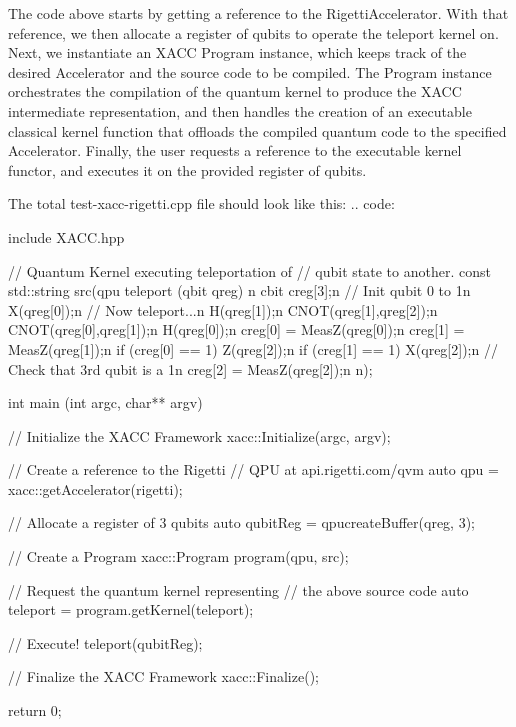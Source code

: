 \documentclass[letterpaper,10pt,english]{sphinxmanual}
\begin{document}
The code above starts by getting a reference to the RigettiAccelerator.
With that reference, we then allocate a register of qubits
to operate the teleport kernel on. Next, we instantiate an XACC Program instance, which keeps track of the
desired Accelerator and the source code to be compiled. The Program instance orchestrates the compilation of the
quantum kernel to produce the XACC intermediate representation, and then handles the creation of an
executable classical kernel function that offloads the compiled quantum code to the specified Accelerator.
Finally, the user requests a reference to the executable kernel functor, and executes it on the
provided register of qubits.

The total test-xacc-rigetti.cpp file should look like this:
.. code:

\begin{sphinxVerbatim}[commandchars=\\\{\}]
\PYGZsh{}include \PYGZdq{}XACC.hpp\PYGZdq{}

// Quantum Kernel executing teleportation of
// qubit state to another.
const std::string src(\PYGZdq{}\PYGZus{}\PYGZus{}qpu\PYGZus{}\PYGZus{} teleport (qbit qreg) \PYGZob{}\PYGZbs{}n\PYGZdq{}
\PYGZdq{}   cbit creg[3];\PYGZbs{}n\PYGZdq{}
\PYGZdq{}   // Init qubit 0 to 1\PYGZbs{}n\PYGZdq{}
\PYGZdq{}   X(qreg[0]);\PYGZbs{}n\PYGZdq{}
\PYGZdq{}   // Now teleport...\PYGZbs{}n\PYGZdq{}
\PYGZdq{}   H(qreg[1]);\PYGZbs{}n\PYGZdq{}
\PYGZdq{}   CNOT(qreg[1],qreg[2]);\PYGZbs{}n\PYGZdq{}
\PYGZdq{}   CNOT(qreg[0],qreg[1]);\PYGZbs{}n\PYGZdq{}
\PYGZdq{}   H(qreg[0]);\PYGZbs{}n\PYGZdq{}
\PYGZdq{}   creg[0] = MeasZ(qreg[0]);\PYGZbs{}n\PYGZdq{}
\PYGZdq{}   creg[1] = MeasZ(qreg[1]);\PYGZbs{}n\PYGZdq{}
\PYGZdq{}   if (creg[0] == 1) Z(qreg[2]);\PYGZbs{}n\PYGZdq{}
\PYGZdq{}   if (creg[1] == 1) X(qreg[2]);\PYGZbs{}n\PYGZdq{}
\PYGZdq{}   // Check that 3rd qubit is a 1\PYGZbs{}n\PYGZdq{}
\PYGZdq{}   creg[2] = MeasZ(qreg[2]);\PYGZbs{}n\PYGZdq{}
\PYGZdq{}\PYGZcb{}\PYGZbs{}n\PYGZdq{});

int main (int argc, char** argv) \PYGZob{}

   // Initialize the XACC Framework
   xacc::Initialize(argc, argv);

   // Create a reference to the Rigetti
   // QPU at api.rigetti.com/qvm
   auto qpu = xacc::getAccelerator(\PYGZdq{}rigetti\PYGZdq{});

   // Allocate a register of 3 qubits
   auto qubitReg = qpu\PYGZhy{}\PYGZgt{}createBuffer(\PYGZdq{}qreg\PYGZdq{}, 3);

   // Create a Program
   xacc::Program program(qpu, src);

   // Request the quantum kernel representing
   // the above source code
   auto teleport = program.getKernel(\PYGZdq{}teleport\PYGZdq{});

   // Execute!
   teleport(qubitReg);

   // Finalize the XACC Framework
   xacc::Finalize();

   return 0;
\PYGZcb{}
\end{sphinxVerbatim}
\end{document}
